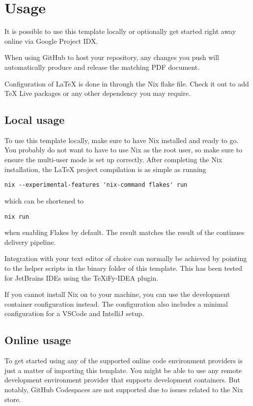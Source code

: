 \section{Usage}\label{sec:usage}

It is possible to use this template locally or optionally get started right away online via Google Project
IDX\parencite{noauthor_project_nodate}.

When using GitHub to host your repository, any changes you push will automatically produce and release the matching PDF
document.

Configuration of LaTeX is done in through the Nix flake file.
Check it out to add TeX Live packages or any other dependency you may require.

\subsection{Local usage}\label{subsec:local-usage}

To use this template locally, make sure to have Nix\parencite{noauthor_download_nodate} installed and ready to go.
You probably do not want to have to use Nix as the root user, so make sure to ensure the multi-user mode is set up
correctly\parencite{noauthor_multi-user_nodate}.
After completing the Nix installation, the LaTeX project compilation is as simple as running

\begin{verbatim}
nix --experimental-features 'nix-command flakes' run
\end{verbatim}

which can be shortened to

\begin{verbatim}
nix run
\end{verbatim}

when enabling Flakes by default\parencite{noauthor_flakes_nodate}.
The result matches the result of the continues delivery pipeline.

Integration with your text editor of choice can normally be achieved by pointing to the helper scripts in the binary
folder of this template.
This has been tested for JetBrains IDEs using the TeXiFy-IDEA plugin\parencite{noauthor_hannah-stentexify-idea_2025}.

If you cannot install Nix on to your machine, you can use the development
container\parencite{noauthor_development_nodate} configuration instead.
The configuration also includes a minimal configuration for a VSCode and IntelliJ setup.

\subsection{Online usage}\label{subsec:online-usage}

To get started using any of the supported online code environment providers is just a matter of importing this template.
You might be able to use any remote development environment provider that supports development containers.
But notably, GitHub Codespaces\parencite{noauthor_github_2025} are not supported due to issues related to the Nix
store\parencite{noauthor_nix_nodate}.
